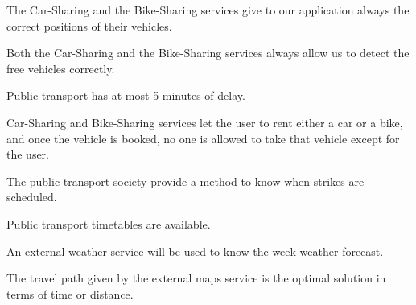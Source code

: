 \begin{domainList}
\item The Car-Sharing and the Bike-Sharing services give to our application always the correct positions of their vehicles.

\item Both the Car-Sharing and the Bike-Sharing services always allow us to detect the free vehicles correctly.

\item Public transport has at most 5 minutes of delay.

\item Car-Sharing and Bike-Sharing services let the user to rent either a car or a bike, and once the vehicle is booked, no one is allowed to take that vehicle except for the user.

\item The public transport society provide a method to know when strikes are scheduled.

\item Public transport timetables are available.

\item An external weather service will be used to know the week weather forecast.

\item The travel path given by the external maps service is the optimal solution in terms of time or distance.

\end{domainList}

